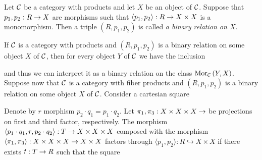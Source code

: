 \begin{definition}
Let ${\mathcal C}$ be a category with products and let $X$ be an object of ${\mathcal C}$. Suppose that $p_1,p_2:R\rightarrow X$ are morphisms such that $\langle p_1, p_2\rangle:R\rightarrow X\times X$ is a monomorphism. Then a triple $(R,p_1,p_2)$ is called \textit{a binary relation on $X$}.
\end{definition}
\noindent
If ${\mathcal C}$ is a category with products and $(R,p_1,p_2)$ is a binary relation on some object $X$ of ${\mathcal C}$, then for every object $Y$ of ${\mathcal C}$ we have the inclusion
\begin{center}
\end{center}
and thus we can interpret it as a binary relation on the class $\mathrm{Mor}_{{\mathcal C}}\left(Y,X\right)$.\\
Suppose now that ${\mathcal C}$ is a category with fiber products and $(R,p_1,p_2)$ is a binary relation on some object $X$ of ${\mathcal C}$. Consider a cartesian square
\begin{center}
\end{center}
Denote by $r$ morphism $p_2\cdot q_1 = p_1\cdot q_2$. Let $\pi_1,\pi_3:X\times X\times X\rightarrow $ be projections on first and third factor, respectively. The morphism $\langle p_1\cdot q_1, r, p_2\cdot q_2\rangle:T\rightarrow X\times X \times X$ composed with the morphism $\langle \pi_1,\pi_3\rangle:X\times X\times X\rightarrow X\times X$ factors through $\langle p_1,p_2\rangle:R\hookrightarrow X\times X$ if there exists $t:T\rightarrow R$ such that the square
